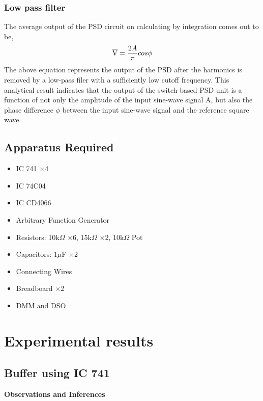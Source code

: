 \documentclass[12pt]{article}
\begin{document}
        \subsubsection{Low pass filter}
            The average output of the PSD circuit on calculating by integration comes out to be, 
            \begin{equation}
                \overline{\rm V} = \frac{2A}{\pi}cos\phi 
            \end{equation}
            The above equation represents the output of the PSD after the harmonics is removed by a low-pass filer with a sufficiently low cutoff frequency. This analytical result indicates that the output of the switch-based PSD unit is a function of not only the amplitude of the input sine-wave signal A, but also the phase difference $\phi$ between the input sine-wave signal and the reference square wave.
            

    \subsection{Apparatus Required}

        \begin{itemize}
            \item IC 741 \(\times\)4
            \item IC 74C04
            \item IC CD4066
            \item Arbitrary Function Generator
            \item Resistors: 10k\(\Omega\) \(\times\)6, 15k\(\Omega\) \(\times\)2, 10k\(\Omega\) Pot
            \item Capacitors: 1\(\mu\)F \(\times\)2
            \item Connecting Wires
            \item Breadboard \(\times\)2
            \item DMM and DSO
        \end{itemize}

\section{Experimental results}
    
    \subsection{Buffer using IC 741}
        \textbf{Observations and Inferences}\\
        
\end{document}
